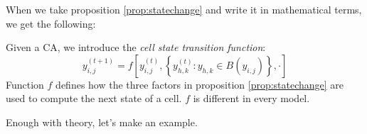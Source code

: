 When we take proposition \ref{prop:statechange} and write it in mathematical terms, we
get the following:

\begin{definition}
\label{def:statetransf}
Given a CA, we introduce the \textit{cell state transition function}:
\begin{equation}
y^{(t+1)}_{i,j} = f \left[ y^{(t)}_{i,j}, 
    \left\{ y^{(t)}_{h,k} : y_{h,k} \in B\left( y_{i,j} \right) \right\}, \cdot \right]
\end{equation}
Function $f$ defines how the three factors in proposition \ref{prop:statechange}
are used to compute the next state of a cell. $f$ is different in every model.
\end{definition}

Enough with theory, let's make an example.

